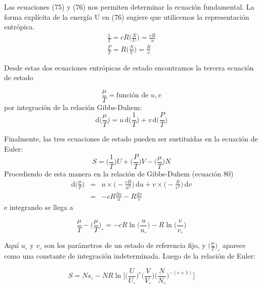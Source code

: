 \documentclass[10pt,twocolumn]{IEEEtran2e}
\newcommand{\ud}{\mathrm{d}}
\begin{document}
Las ecuaciones (75) y (76) nos permiten determinar la ecuaci\'on fundamental. La forma expl\'icita de la energ\'ia U en (76) sugiere que utilicemos la representaci\'on entr\'opica.
\begin{eqnarray}
 \frac{1}{T}=cR\bigg(\frac{N}{U}\bigg)=\frac{cR}{u} \\
 \frac{P}{T}=R\bigg(\frac{N}{V}\bigg)=\frac{R}{v}
\end{eqnarray}

Desde estas dos ecuaciones entr\'opicas de estado encontramos la tercera ecuaci\'on de estado

\begin{equation}
  \frac{\mu}{T}=\textrm{funci\'on de $u,v$}
\end{equation}
por integraci\'on de la relaci\'on Gibbs-Duhem:
\begin{equation}
 \ud \bigg(\frac{\mu}{T}\bigg)=u\,\ud\bigg(\frac{1}{T}\bigg)+v\,\ud\bigg(\frac{P}{T}\bigg) 
\end{equation}

Finalmente, las tres ecuaciones de estado pueden ser sustituidas en la ecuaci\'on de Euler:
\begin{equation}
 S=\bigg(\frac{1}{T} \bigg)U+\bigg(\frac{P}{T}\bigg)V-\bigg(\frac{\mu}{T}\bigg)N
\end{equation}
Procediendo de esta manera en la relaci\'on de Gibbs-Duhem (ecuaci\'on 80)
\begin{eqnarray}
 \ud \bigg(\frac{\mu}{T}\bigg) &= & u \times \bigg(-\frac{cR}{u^{2}}\bigg)\,\ud u + v \times \bigg(-\frac{R}{v^{2}}\bigg)\,\ud v \nonumber \\
 &= & -cR\frac{\ud u}{u} -R\frac{\ud v}{v}
\end{eqnarray}
e integrando se llega a

\begin{equation}
 \frac{\mu}{T}-\bigg(\frac{\mu}{T}\bigg)_{\circ}=-cR \ln \bigg(\frac{u}{u_{\circ}} \bigg) - R \ln\bigg(\frac{v}{v_{\circ}} \bigg) 
\end{equation}

Aqu\'i $u_{\circ}$ y $v_{\circ}$ son los par\'ametros de un estado de referencia fijo, y $\big(\frac{\mu}{T}\big)_{\circ}$ aparece como una constante de integraci\'on indeterminada. Luego de la relaci\'on de Euler:

\begin{equation}
 S=Ns_{\circ}-NR \ln\bigg[ \bigg(\frac{U}{U_{\circ}} \bigg)^{c} \bigg(\frac{V}{V_{\circ}} \bigg) \bigg(\frac{N}{N_{\circ}} \bigg)^{-(c+1)} \bigg]
\end{equation}
\end{document}
